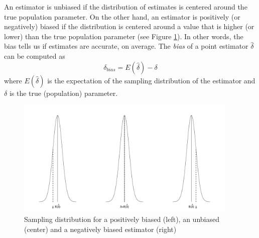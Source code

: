 \documentclass[
  english,
  man,floatsintext]{apa6}
\begin{document}
An estimator is unbiased if the distribution of estimates is centered around the true population parameter. On the other hand, an estimator is positively (or negatively) biased if the distribution is centered around a value that is higher (or lower) than the true population parameter (see Figure \ref{fig:BIAS}). In other words, the bias tells us if estimates are accurate, on average. The \emph{bias} of a point estimator \(\hat{\delta}\) can be computed as
\begin{equation} 
\delta_{bias}=E(\hat{\delta})-\delta
\label{eq:BIAS}
\end{equation}
where \(E(\hat{\delta})\) is the expectation of the sampling distribution of the estimator and \(\delta\) is the true (population) parameter.

\begin{figure}
\includegraphics[width=400px]{ES_files/figure-latex/BIAS-1} \caption{Sampling distribution for a positively biased (left), an unbiased (center) and a negatively biased estimator (right)}\label{fig:BIAS}
\end{figure}
\end{document}
